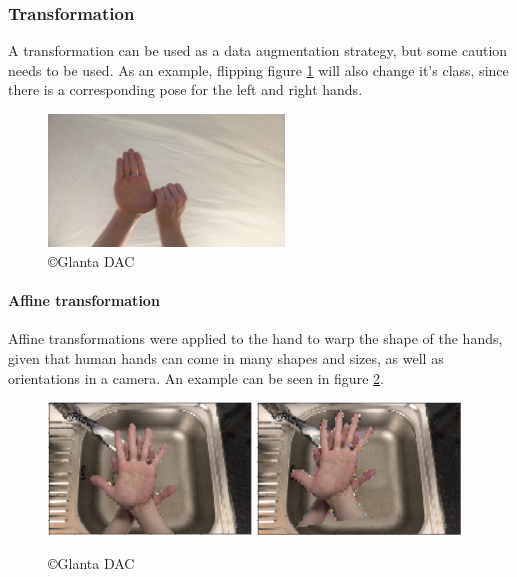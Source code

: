         \subsubsection{Transformation}
        A transformation can be used as a data augmentation strategy, but some caution needs to be used. As an example, flipping figure \ref{fig:flipped_example} will also change it's class, since there is a corresponding pose for the left and right hands. 

        \begin{figure}[h]
            \centering
            \includegraphics[height=100pt]{../img/flipped_example.png}
            \caption{\copyright \space Glanta DAC}
            \label{fig:flipped_example}
        \end{figure}

        \paragraph{Affine transformation}
        Affine transformations were applied to the hand to warp the shape of the hands, given that human hands can come in many shapes and sizes, as well as orientations in a camera. An example can be seen in figure \ref{fig:affine_example}.

        \begin{figure}[h]
            \centering
            \includegraphics[height=100pt]{../img/affine/0.png}
            \includegraphics[height=100pt]{../img/affine/1.png}
            \caption{\copyright \space Glanta DAC}
            \label{fig:affine_example}
        \end{figure}

